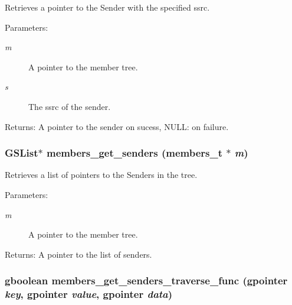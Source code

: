 Retrieves a pointer to the Sender with the specified ssrc. \begin{Desc}
\item[Parameters:]
\begin{description}
\item[{\em m}]A pointer to the member tree. \item[{\em s}]The ssrc of the sender. \end{description}
\end{Desc}
\begin{Desc}
\item[Returns:]A pointer to the sender on sucess, NULL: on failure. \end{Desc}
\subsubsection{\setlength{\rightskip}{0pt plus 5cm}GSList$\ast$ members\_\-get\_\-senders ({\bf members\_\-t} $\ast$ {\em m})}\label{members_8c_a12}


Retrieves a list of pointers to the Senders in the tree. \begin{Desc}
\item[Parameters:]
\begin{description}
\item[{\em m}]A pointer to the member tree. \end{description}
\end{Desc}
\begin{Desc}
\item[Returns:]A pointer to the list of senders. \end{Desc}
\subsubsection{\setlength{\rightskip}{0pt plus 5cm}gboolean members\_\-get\_\-senders\_\-traverse\_\-func (gpointer {\em key}, gpointer {\em value}, gpointer {\em data})\hspace{0.3cm}{\tt  [static]}}\label{members_8c_a11}


